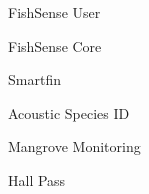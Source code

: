\item FishSense User
\item FishSense Core
\item Smartfin
\item Acoustic Species ID
\item Mangrove Monitoring
\item Hall Pass